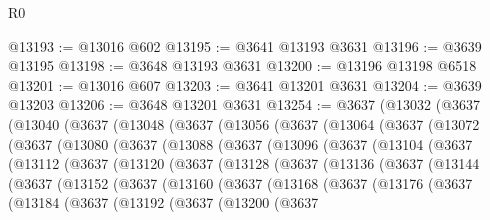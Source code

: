 \begin{lexlean}{R0}
\begin{coremodule}
@13193 := @13016 @602
@13195 := @3641 @13193 @3631
@13196 := @3639 @13195
@13198 := @3648 @13193 @3631
@13200 := @13196 @13198 @6518
@13201 := @13016 @607
@13203 := @3641 @13201 @3631
@13204 := @3639 @13203
@13206 := @3648 @13201 @3631
@13254 := @3637
    (@13032
      (@3637
        (@13040
          (@3637
            (@13048
              (@3637
                (@13056
                  (@3637
                    (@13064
                      (@3637
                        (@13072
                          (@3637
                            (@13080
                              (@3637
                                (@13088
                                  (@3637
                                    (@13096
                                      (@3637
                                        (@13104
                                          (@3637
                                            (@13112
                                              (@3637
                                                (@13120
                                                  (@3637
                                                    (@13128
                                                      (@3637
                                                        (@13136
                                                          (@3637
                                                            (@13144
                                                              (@3637
                                                                (@13152
                                                                  (@3637
                                                                    (@13160
                                                                      (@3637
                                                                        (@13168
                                                                          (@3637
                                                                            (@13176
                                                                              (@3637
                                                                                (@13184
                                                                                  (@3637
                                                                                    (@13192
                                                                                      (@3637
                                                                                        (@13200
                                                                                          (@3637

\end{coremodule}
\end{lexlean}
